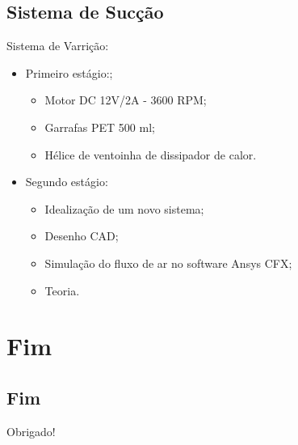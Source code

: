 \documentclass{beamer}
\begin{document}
\subsection{Sistema de Sucção}
\begin{frame}
  Sistema de Varrição:
    \begin{itemize}
        \item Primeiro estágio:;
        \begin{itemize}
          \item Motor DC 12V/2A - 3600 RPM;
          \item Garrafas PET 500 ml;
          \item Hélice de ventoinha de dissipador de calor.
        \end{itemize}
        \item Segundo estágio:
        \begin{itemize}
          \item Idealização de um novo sistema;
          \item Desenho CAD;
          \item Simulação do fluxo de ar no software Ansys CFX;
          \item Teoria.
        \end{itemize}
    \end{itemize}
\end{frame}

\section{Fim}
\subsection{Fim}
\begin{frame}
\Huge{\centerline{Obrigado!}}
\end{frame}

\end{document}
